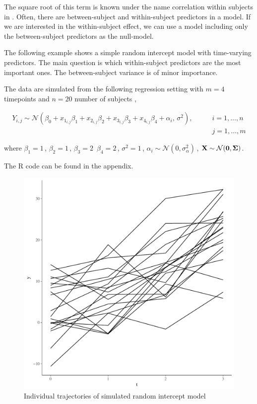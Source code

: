 \documentclass[11pt,a4paper,twoside]{book}
\makeatletter
\def\maxwidth{ %
  \ifdim\Gin@nat@width>\linewidth
    \linewidth
  \else
    \Gin@nat@width
  \fi
}
\newenvironment{knitrout}{}{} %
\makeatother
\begin{document}
The square root of this term is known under the name correlation within subjects in \cite{Bland1995}. Often, there are between-subject and within-subject predictors in a model. If we are interested in the within-subject effect, we can use a model including only the between-subject predictors as the null-model.

The following example shows a simple random intercept model with time-varying predictors. The main question is which within-subject predictors are the most important ones. The between-subject variance is of minor importance. 

The data are simulated from the following regression setting with $m = 4$ timepoints and $n = 20$ number of subjects ,

\begin{align*} 
Y_{i,j} \sim \mathcal{N}(\beta_{0}+x_{1_{i,j}} \beta_{1}+x_{2_{i,j}} \beta_{2}+x_{3_{i,j}} \beta_{3}+x_{4_{i,j}} \beta_{4} + \alpha_{i}, \, \sigma^2), \qquad &i = 1, \dots, n \\  &j = 1, \dots, m
\end{align*} 

where $\beta_{1} = 1 \,$,  $\beta_{2} = 1 \,$,   $\beta_{3} = 2 \,$  $\beta_{4}=2 \,$, $\sigma^2 = 1 \, $, $\alpha_{i} \sim \mathcal{N}(0, \sigma_{\alpha}^2) \,$, ${\mathbf{X}} \sim \mathcal{N}({\mathbf{0}}, {\boldsymbol{\Sigma}}{})$.

The R code can be found in the appendix.



\begin{knitrout}
\color{fgcolor}\begin{figure}
\includegraphics[width=\maxwidth]{figure/ch04_fig_repeated_plot_ri-1} \caption[Individual trajectories of simulated random intercept model]{Individual trajectories of simulated random intercept model}\label{fig:.repeated.plot.ri}
\end{figure}


\end{knitrout}
\end{document}
